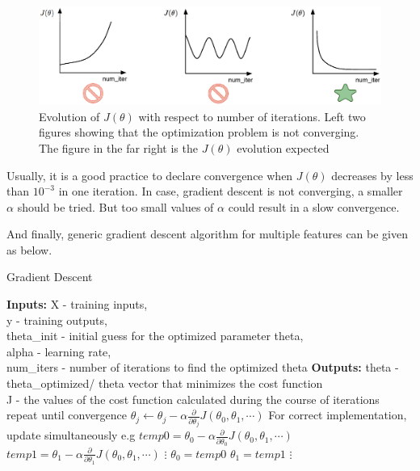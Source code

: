 \begin{figure}[hbt]
\begin{center}
\includegraphics[width=15cm]{figures/visualizeCostFunc}    %
\caption{Evolution of $J(\theta)$ with respect to number of iterations. Left two figures showing that the optimization problem is not converging. The figure in the far right is the $J(\theta)$ evolution expected} 
\label{fig:visualizeCostFunc}
\end{center}
\end{figure}

Usually, it is a good practice to declare convergence when $J(\theta)$ decreases by less than $10^{-3}$ in one iteration. 
In case, gradient descent is not converging, a smaller $\alpha$ should be tried. 
But too small values of $\alpha$ could result in a slow convergence. 

And finally, generic gradient descent algorithm for multiple features can be given as below.

 \begin{algorithm}
   \caption{Gradient Descent}
    \begin{algorithmic}[1]
           \State \textbf{Inputs:} X - training inputs, \\
           \qquad \qquad y - training outputs, \\
           \qquad \qquad theta\_init - initial guess for the optimized parameter theta,\\ 
           \qquad \qquad alpha - learning rate, \\
           \qquad \qquad num\_iters - number of iterations to find the optimized theta
           \State \textbf{Outputs:} theta - theta\_optimized/ theta vector that minimizes the cost function \\
           \qquad \qquad J - the values of the cost function calculated during the course of iterations
    \State repeat until convergence {
    \State $\theta_j \leftarrow \theta_j - \alpha \frac{\partial}{\partial \theta_j}J(\theta_0, \theta_1, \cdots)$
    	 \State For correct implementation, update simultaneously e.g
	 \State 	\qquad  $temp0 = \theta_0 - \alpha \frac{\partial}{\partial \theta_0}J(\theta_0, \theta_1, \cdots)$
	 \State 	\qquad  $temp1 = \theta_1 - \alpha \frac{\partial}{\partial \theta_1}J(\theta_0, \theta_1, \cdots)$
          \State 	\qquad  \qquad $\vdots$
          \State 	\qquad  $\theta_0 = temp0$
	 \State 	\qquad  $\theta_1 = temp1$
	 \State 	\qquad  \qquad $\vdots$
		 }
       \EndFunction
\end{algorithmic}
\end{algorithm}

